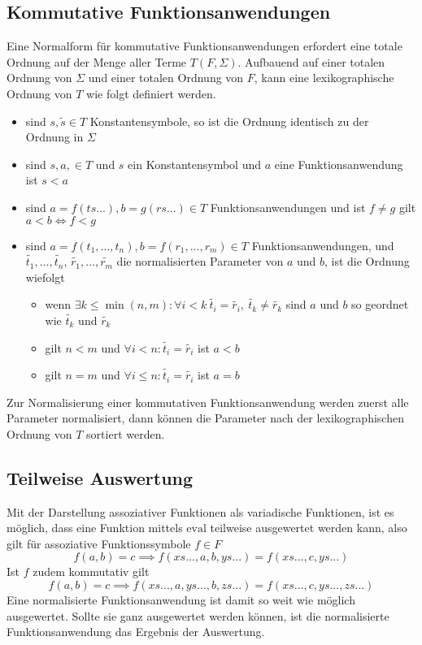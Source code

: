 \documentclass{article}
\begin{document}
\subsection{Kommutative Funktionsanwendungen}
Eine Normalform für kommutative Funktionsanwendungen erfordert eine totale Ordnung auf der Menge aller Terme $T(F, \Sigma)$. Aufbauend auf einer totalen Ordnung von $\Sigma$ und einer totalen Ordnung von $F$, kann eine lexikographische Ordnung von $T$ wie folgt definiert werden. 
\begin{itemize}
	\item{sind $s, \tilde{s} \in T$ Konstantensymbole, so ist die Ordnung identisch zu der Ordnung in $\Sigma$}
	\item{sind $s, a, \in T$ und $s$ ein Konstantensymbol und $a$ eine Funktionsanwendung ist $s < a$ }
	\item{sind $a = f(ts...), b = g(rs...) \in T$ Funktionsanwendungen und ist $f \neq g$ gilt $a < b \iff f < g $}
	\item{sind $a = f(t_1, \dots, t_n), b = f(r_1, \dots, r_m) \in T$ Funktionsanwendungen, und $\tilde{t_1}, \dots, \tilde{t_n}$, $\tilde{r_1}, \dots, \tilde{r_m}$ die normalisierten Parameter von $a$ und $b$, ist die Ordnung wiefolgt}
	\begin{itemize}
		\item{wenn $\exists k \leq \min{(n, m)} \colon \forall i < k ~ \tilde{t_i} = \tilde{r_i} ,~ \tilde{t_k} \neq \tilde{r_k} $ sind $a$ und $b$ so geordnet wie $\tilde{t_k}$ und $\tilde{r_k}$}
		\item{gilt $n < m$ und $\forall i < n\colon \tilde{t_i} = \tilde{r_i}$ ist $a < b$}
		\item{gilt $n = m$ und $\forall i \leq n\colon \tilde{t_i} = \tilde{r_i}$ ist $a = b$}
	\end{itemize}
\end{itemize}
Zur Normalisierung einer kommutativen Funktionsanwendung werden zuerst alle Parameter normalisiert, dann können die Parameter nach der lexikographischen Ordnung von $T$ sortiert werden.

\subsection{Teilweise Auswertung}
Mit der Darstellung assoziativer Funktionen als variadische Funktionen, ist es möglich, dass eine Funktion mittels $\mathrm{eval}$ teilweise ausgewertet werden kann, also gilt für assoziative Funktionssymbole $f \in F$
$$f(a, b) = c \implies f(xs..., a, b, ys...) = f(xs..., c, ys...)$$
Ist $f$ zudem kommutativ gilt 
$$f(a, b) = c \implies f(xs..., a, ys..., b, zs...) = f(xs..., c, ys..., zs...)$$
Eine normalisierte Funktionsanwendung ist damit so weit wie möglich ausgewertet. Sollte sie ganz ausgewertet werden können, ist die normalisierte Funktionsanwendung das Ergebnis der Auswertung.
\end{document}
